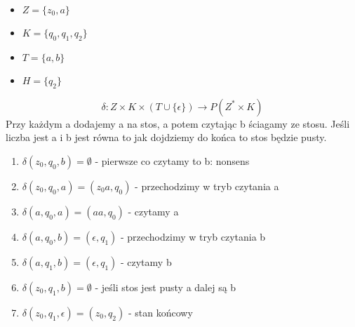 \documentclass{../notatki}
\begin{document}
\begin{itemize}
  \item $Z = \{z_0, a\}$
  \item $K = \{q_0, q_1, q_2\}$
  \item $T = \{a, b\}$
  \item $H = \{q_2\}$
\end{itemize}

$$
\delta: Z \times K \times (T \cup \{\epsilon\}) \rightarrow P(Z^* \times K)
$$
Przy każdym a dodajemy a na stos, a potem czytając b ściagamy ze stosu. Jeśli
liczba jest a i b jest równa to jak dojdziemy do końca to stos będzie pusty.

\begin{enumerate}
  \item $\delta(z_0, q_0, b) = \emptyset$ - pierwsze co czytamy to b: nonsens
  \item $\delta(z_0, q_0, a) = (z_0a, q_0)$ - przechodzimy w tryb czytania a
  \item $\delta(a, q_0, a) = (aa, q_0)$ - czytamy a
  \item $\delta(a, q_0, b) = (\epsilon, q_1)$ - przechodzimy w tryb czytania b
  \item $\delta(a, q_1, b) = (\epsilon, q_1)$ - czytamy b
  \item $\delta(z_0, q_1, b) = \emptyset$ - jeśli stos jest pusty a dalej są b
  \item $\delta(z_0, q_1, \epsilon) = (z_0, q_2)$ - stan końcowy
\end{enumerate}
\end{document}

